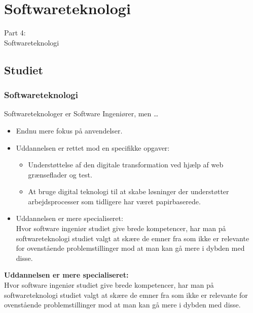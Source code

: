 {
\renewcommand{\bgcolor}{st}

\section{Softwareteknologi}
\begin{frame}
    \vspace{25mm}
    \begin{center}
        \Huge{Part 4:\\Softwareteknologi}
    \end{center}
\end{frame}

\subsection{Studiet}
\begin{frame}[fragile]
  \frametitle{Softwareteknologi }
  \vspace{1mm}
  Softwareteknologer er Software Ingeniører, men \ldots
  \begin{itemize}
    \item Endnu mere fokus på anvendelser.
    \item Uddannelsen er rettet mod en specifikke opgaver:
      \begin{itemize}
        \item Understøttelse af den digitale transformation ved hjælp af web grænseflader og test.
        \item At bruge digital teknologi til at skabe løsninger der understøtter arbejdsprocesser som tidligere har været papirbaserede.
      \end{itemize}
    \pause
    \item Uddannelsen er mere specialiseret: \\
      Hvor software ingeniør studiet give brede kompetencer, har man på softwareteknologi studiet valgt at skære de emner fra som ikke er relevante for ovenstående problemstillinger mod at man kan gå mere i dybden med disse.
  \end{itemize}
  
  \pause
  \vspace{3mm}
  \textbf{Uddannelsen er mere specialiseret:} \\
  Hvor software ingeniør studiet give brede kompetencer, har man på softwareteknologi studiet valgt at skære de emner fra som ikke er relevante for ovenstående problemstillinger mod at man kan gå mere i dybden med disse.
\end{frame}

}
